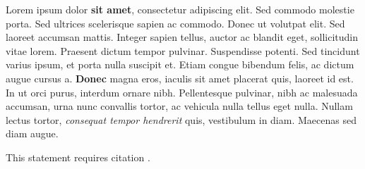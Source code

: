 
Lorem ipsum dolor \textbf{sit amet}, consectetur adipiscing elit. Sed commodo
molestie porta. Sed ultrices scelerisque sapien ac commodo. Donec ut volutpat
elit. Sed laoreet accumsan mattis. Integer sapien tellus, auctor ac blandit
eget, sollicitudin vitae lorem. Praesent dictum tempor pulvinar. Suspendisse
potenti. Sed tincidunt varius ipsum, et porta nulla suscipit et. Etiam congue
bibendum felis, ac dictum augue cursus a. \textbf{Donec} magna eros, iaculis
sit amet placerat quis, laoreet id est. In ut orci purus, interdum ornare nibh.
Pellentesque pulvinar, nibh ac malesuada accumsan, urna nunc convallis tortor,
ac vehicula nulla tellus eget nulla. Nullam lectus tortor, \textit{consequat
tempor hendrerit} quis, vestibulum in diam. Maecenas sed diam augue.

This statement requires citation \cite{Smith:2012qr}.

